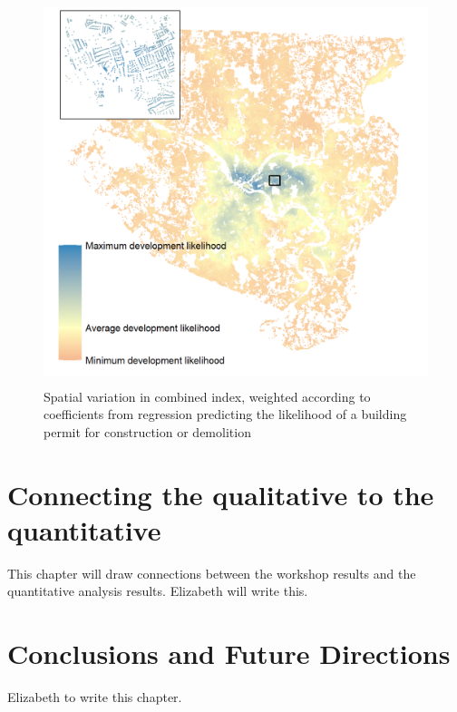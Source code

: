 \documentclass[
]{book}
\begin{document}
\begin{figure}
\includegraphics[width=1\linewidth]{04_figures/combined} \caption{Spatial variation in combined index, weighted according to coefficients from regression predicting the likelihood of a building permit for construction or demolition}\label{fig:combined-map}
\end{figure}

\hypertarget{connecting-the-qualitative-to-the-quantitative}{%
\chapter{Connecting the qualitative to the quantitative}\label{connecting-the-qualitative-to-the-quantitative}}

This chapter will draw connections between the workshop
results and the quantitative analysis results. Elizabeth will write this.

\hypertarget{conclusions-and-future-directions}{%
\chapter{Conclusions and Future Directions}\label{conclusions-and-future-directions}}

Elizabeth to write this chapter.

  
\end{document}
